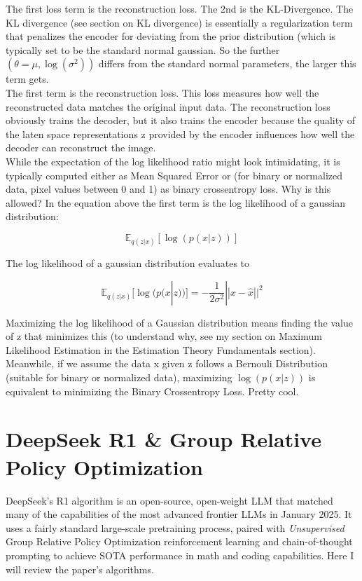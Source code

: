 \documentclass[12pt]{article}
\begin{document}
The first loss term is the reconstruction loss. The 2nd is the KL-Divergence. The KL divergence (see section on KL divergence) is essentially a regularization term that penalizes the encoder for deviating from the prior distribution (which is typically set to be the standard normal gaussian. So the further \((\theta = \mu, \log(\sigma^2))\) differs from the standard normal parameters, the larger this term gets.\\

The first term is the reconstruction loss. This loss measures how well the reconstructed data matches the original input data. The reconstruction loss obviously trains the decoder, but it also trains the encoder because the quality of the laten space representations z provided by the encoder influences how well the decoder can reconstruct the image. \\

While the expectation of the log likelihood ratio might look intimidating, it is typically computed either as Mean Squared Error or (for binary or normalized data, pixel values between 0 and 1) as binary crossentropy loss. Why is this allowed? In the equation above the first term is the log likelihood of a gaussian distribution:

\[ \mathbb{E}_{q(z|x)}[\log(p(x|z))] \]

The log likelihood of a gaussian distribution evaluates to 

\[ \mathbb{E}_{q(z|x)}[\log(p(x|z))] = -\frac{1}{2\sigma^2}|| x - \hat{x}||^2\]

Maximizing the log likelihood of a Gaussian distribution means finding the value of z that minimizes this (to understand why, see my section on Maximum Likelihood Estimation in the Estimation Theory Fundamentals section). \\

Meanwhile, if we assume the data x given z follows a Bernouli Distribution (suitable for binary or normalized data), maximizing \(\log(p(x|z))\) is equivalent to minimizing the Binary Crossentropy Loss. Pretty cool.
\section{DeepSeek R1 \& Group Relative Policy Optimization}
DeepSeek's R1 algorithm is an open-source, open-weight LLM that matched many of the capabilities of the most advanced frontier LLMs in January 2025. It uses a fairly standard large-scale pretraining process, paired with \emph{Unsupervised} Group Relative Policy Optimization reinforcement learning and chain-of-thought prompting to achieve SOTA performance in math and coding capabilities. Here I will review the paper's algorithms. \\
\end{document}
